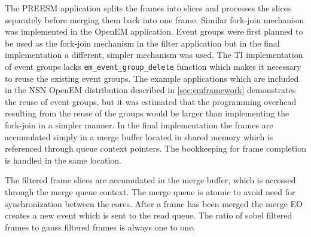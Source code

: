  The PREESM application splits the frames into slices and processes the slices separately before merging them back into one frame. Similar fork-join mechanism was implemented in the OpenEM application. Event groups were first planned to be used as the fork-join mechanism in the filter application but in the final implementation a different, simpler mechanism was used. The TI implementation of event groups lacks \texttt{em\_event\_group\_delete} function which makes it necessary to reuse the existing event groups. The example applications which are included in the NSN OpenEM distribution described in \ref{sec:emframework} demonstrates the reuse of event groups, but it was estimated that the programming overhead resulting from the reuse of the groups would be larger than implementing the fork-join in a simpler manner. In the final implementation the frames are accumulated simply in a merge buffer located in shared memory which is referenced through queue context pointers. The bookkeeping for frame completion is handled in the same location.

The filtered frame slices are accumulated in the merge buffer, which is accessed through the merge queue context. The merge queue is atomic to avoid need for synchronization between the cores. After a frame has been merged the merge EO creates a new event which is sent to the read queue. The ratio of sobel filtered frames to gauss filtered frames is always one to one.
